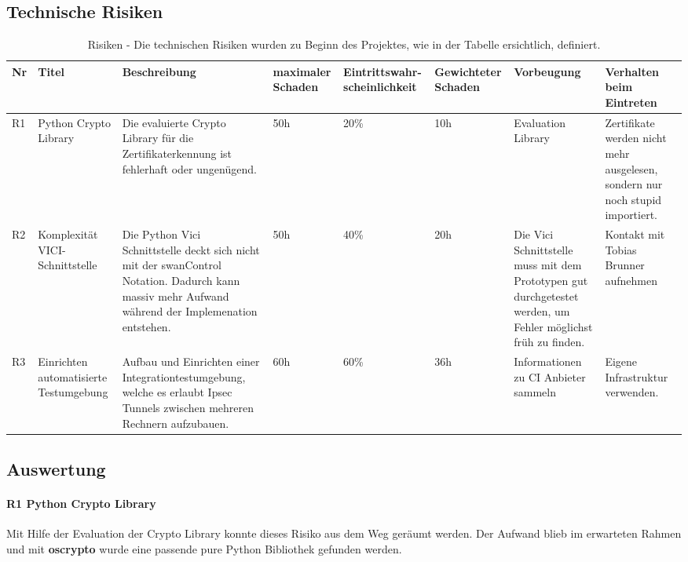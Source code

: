 \begin{landscape}
\subsection{Technische Risiken}
\begin{table}[H]
    \begin{tabular}{|p{0.4cm}|p{2.5cm}|p{7cm}|p{1.5cm}|p{2.25cm}|p{1.75cm}|p{3cm}|p{4cm}|}
    \hline    
    \rowcolor{lightblue}
    Nr & Titel & Beschreibung & maximaler Schaden & Eintrittswahr-scheinlichkeit & Gewichteter Schaden & Vorbeugung & Verhalten beim Eintreten \\ \hline
	R1 & Python Crypto Library & Die evaluierte Crypto Library für die Zertifikaterkennung ist fehlerhaft oder ungenügend. & 50h & 20\% & 10h & Evaluation Library & Zertifikate werden nicht mehr ausgelesen, sondern nur noch stupid importiert. \\ \hline
	R2 & Komplexität VICI-Schnittstelle & Die Python Vici Schnittstelle deckt sich nicht mit der swanControl Notation. Dadurch kann massiv mehr Aufwand während der Implemenation entstehen. & 50h & 40\% & 20h & Die Vici Schnittstelle muss mit dem Prototypen gut durchgetestet werden, um Fehler möglichst früh zu finden. & Kontakt mit Tobias Brunner aufnehmen \\ \hline
	R3 & Einrichten automatisierte Testumgebung & Aufbau und Einrichten einer Integrationtestumgebung, welche es erlaubt Ipsec Tunnels zwischen mehreren Rechnern aufzubauen. & 60h & 60\% & 36h & Informationen zu CI Anbieter sammeln & Eigene Infrastruktur verwenden. \\ \hline
    \end{tabular}
    \caption[Risiken]{Risiken - Die technischen Risiken wurden zu Beginn des Projektes, wie in der Tabelle ersichtlich, definiert.}
\end{table}
\end{landscape}

\subsection{Auswertung}
\paragraph{R1 Python Crypto Library} Mit Hilfe der Evaluation der Crypto Library konnte dieses Risiko aus dem Weg geräumt werden. Der Aufwand blieb im erwarteten Rahmen und mit \textbf{oscrypto} wurde eine passende pure Python Bibliothek gefunden werden.

